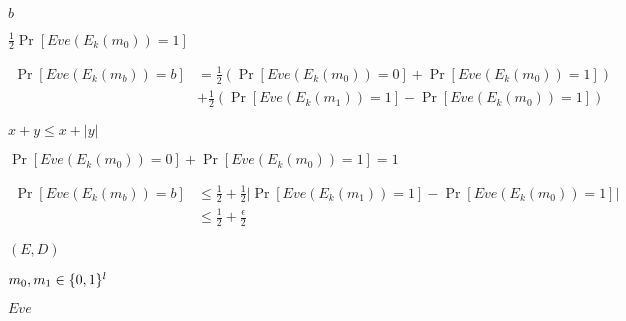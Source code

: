 \documentclass[10pt]{book}
\begin{document}
\begin{mdSnippets}
\begin{mdDisplaySnippet}[6f4b49248009c26ffb673a2827b1df2c]
\[\]%
\end{mdDisplaySnippet}%
\begin{mdInlineSnippet}%
$b$\end{mdInlineSnippet}%
\begin{mdInlineSnippet}[44ef18667e4bf466dc437a9c3ec47d9b]%
$\frac{1}{2}\Pr[Eve(E_k(m_0)) = 1]$\end{mdInlineSnippet}%
\begin{mdDisplaySnippet}%
\[%
\begin{aligned}
\Pr[Eve(E_k(m_b)) = b] &= \frac{1}{2} (\Pr[Eve(E_k(m_0)) = 0] + \Pr[Eve(E_k(m_0)) = 1]) \\
&+\frac{1}{2}(\Pr[Eve(E_k(m_1)) = 1] - \Pr[Eve(E_k(m_0)) = 1])
\end{aligned}
\]%
\end{mdDisplaySnippet}%
\begin{mdInlineSnippet}[240f41919a2f2c65e0d4ffff46184e65]%
$x + y \leq x + |y|$\end{mdInlineSnippet}%
\begin{mdInlineSnippet}%
$\Pr[Eve(E_k(m_0)) = 0] + \Pr[Eve(E_k(m_0)) = 1] = 1$\end{mdInlineSnippet}%
\begin{mdDisplaySnippet}%
\[%
\begin{aligned}
\Pr[Eve(E_k(m_b)) = b] &\leq \frac{1}{2} + \frac{1}{2}|\Pr[Eve(E_k(m_1)) = 1] - \Pr[Eve(E_k(m_0)) = 1]| \\
&\leq \frac{1}{2} + \frac{\epsilon}{2} 
\end{aligned}
\]%
\end{mdDisplaySnippet}%
\begin{mdInlineSnippet}[c150726dc018e82825c0c3617f46a1c9]%
$(E,D)$\end{mdInlineSnippet}%
\begin{mdInlineSnippet}[79813aa61163871708c094e8192a07e2]%
$m_0,m_1 \in \{0,1\}^l$\end{mdInlineSnippet}%
\begin{mdInlineSnippet}%
$Eve$\end{mdInlineSnippet}%

\end{mdSnippets}
\end{document}
